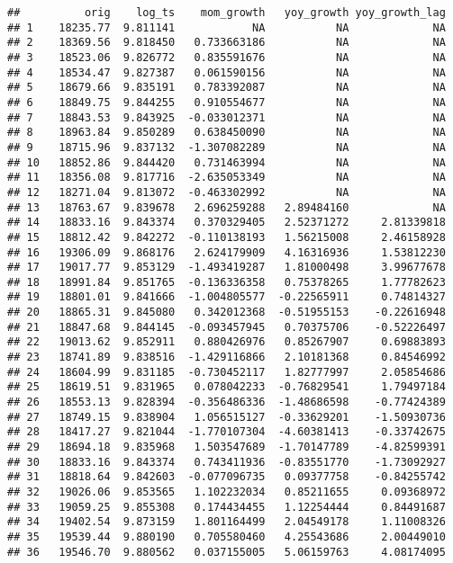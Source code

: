 \documentclass[
]{article}
\begin{document}
\begin{verbatim}
##          orig    log_ts    mom_growth   yoy_growth yoy_growth_lag
## 1    18235.77  9.811141            NA           NA             NA
## 2    18369.56  9.818450   0.733663186           NA             NA
## 3    18523.06  9.826772   0.835591676           NA             NA
## 4    18534.47  9.827387   0.061590156           NA             NA
## 5    18679.66  9.835191   0.783392087           NA             NA
## 6    18849.75  9.844255   0.910554677           NA             NA
## 7    18843.53  9.843925  -0.033012371           NA             NA
## 8    18963.84  9.850289   0.638450090           NA             NA
## 9    18715.96  9.837132  -1.307082289           NA             NA
## 10   18852.86  9.844420   0.731463994           NA             NA
## 11   18356.08  9.817716  -2.635053349           NA             NA
## 12   18271.04  9.813072  -0.463302992           NA             NA
## 13   18763.67  9.839678   2.696259288   2.89484160             NA
## 14   18833.16  9.843374   0.370329405   2.52371272     2.81339818
## 15   18812.42  9.842272  -0.110138193   1.56215008     2.46158928
## 16   19306.09  9.868176   2.624179909   4.16316936     1.53812230
## 17   19017.77  9.853129  -1.493419287   1.81000498     3.99677678
## 18   18991.84  9.851765  -0.136336358   0.75378265     1.77782623
## 19   18801.01  9.841666  -1.004805577  -0.22565911     0.74814327
## 20   18865.31  9.845080   0.342012368  -0.51955153    -0.22616948
## 21   18847.68  9.844145  -0.093457945   0.70375706    -0.52226497
## 22   19013.62  9.852911   0.880426976   0.85267907     0.69883893
## 23   18741.89  9.838516  -1.429116866   2.10181368     0.84546992
## 24   18604.99  9.831185  -0.730452117   1.82777997     2.05854686
## 25   18619.51  9.831965   0.078042233  -0.76829541     1.79497184
## 26   18553.13  9.828394  -0.356486336  -1.48686598    -0.77424389
## 27   18749.15  9.838904   1.056515127  -0.33629201    -1.50930736
## 28   18417.27  9.821044  -1.770107304  -4.60381413    -0.33742675
## 29   18694.18  9.835968   1.503547689  -1.70147789    -4.82599391
## 30   18833.16  9.843374   0.743411936  -0.83551770    -1.73092927
## 31   18818.64  9.842603  -0.077096735   0.09377758    -0.84255742
## 32   19026.06  9.853565   1.102232034   0.85211655     0.09368972
## 33   19059.25  9.855308   0.174434455   1.12254444     0.84491687
## 34   19402.54  9.873159   1.801164499   2.04549178     1.11008326
## 35   19539.44  9.880190   0.705580460   4.25543686     2.00449010
## 36   19546.70  9.880562   0.037155005   5.06159763     4.08174095

\end{verbatim}
\end{document}
